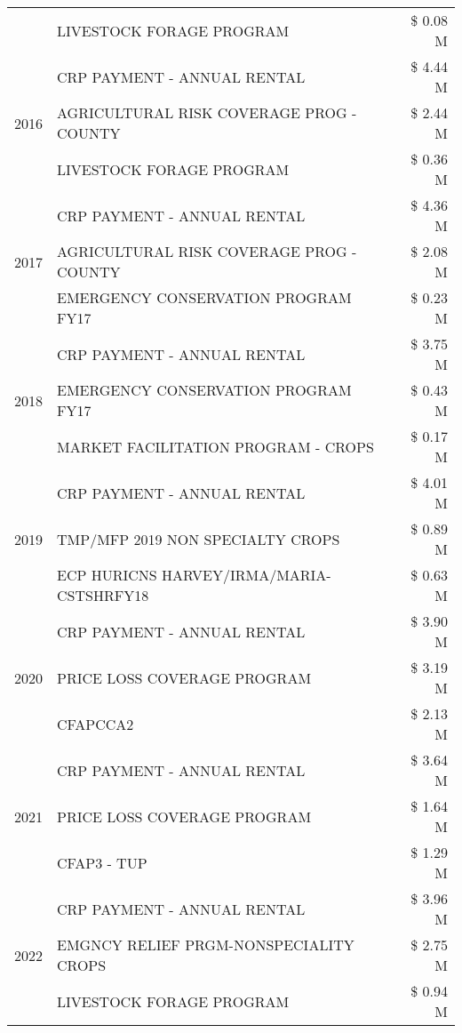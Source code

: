 \begin{tabular}{llr}
 & LIVESTOCK FORAGE PROGRAM & \$ 0.08 M \\
\cline{1-3}
\multirow[t]{3}{*}{2016} & CRP PAYMENT - ANNUAL RENTAL & \$ 4.44 M \\
 & AGRICULTURAL RISK COVERAGE PROG - COUNTY & \$ 2.44 M \\
 & LIVESTOCK FORAGE PROGRAM & \$ 0.36 M \\
\cline{1-3}
\multirow[t]{3}{*}{2017} & CRP PAYMENT - ANNUAL RENTAL & \$ 4.36 M \\
 & AGRICULTURAL RISK COVERAGE PROG - COUNTY & \$ 2.08 M \\
 & EMERGENCY CONSERVATION PROGRAM FY17 & \$ 0.23 M \\
\cline{1-3}
\multirow[t]{3}{*}{2018} & CRP PAYMENT - ANNUAL RENTAL & \$ 3.75 M \\
 & EMERGENCY CONSERVATION PROGRAM FY17 & \$ 0.43 M \\
 & MARKET FACILITATION PROGRAM - CROPS & \$ 0.17 M \\
\cline{1-3}
\multirow[t]{3}{*}{2019} & CRP PAYMENT - ANNUAL RENTAL & \$ 4.01 M \\
 & TMP/MFP 2019 NON SPECIALTY CROPS & \$ 0.89 M \\
 & ECP HURICNS HARVEY/IRMA/MARIA-CSTSHRFY18 & \$ 0.63 M \\
\cline{1-3}
\multirow[t]{3}{*}{2020} & CRP PAYMENT - ANNUAL RENTAL & \$ 3.90 M \\
 & PRICE LOSS COVERAGE PROGRAM & \$ 3.19 M \\
 & CFAPCCA2 & \$ 2.13 M \\
\cline{1-3}
\multirow[t]{3}{*}{2021} & CRP PAYMENT - ANNUAL RENTAL & \$ 3.64 M \\
 & PRICE LOSS COVERAGE PROGRAM & \$ 1.64 M \\
 & CFAP3 - TUP & \$ 1.29 M \\
\cline{1-3}
\multirow[t]{3}{*}{2022} & CRP PAYMENT - ANNUAL RENTAL & \$ 3.96 M \\
 & EMGNCY RELIEF PRGM-NONSPECIALITY CROPS & \$ 2.75 M \\
 & LIVESTOCK FORAGE PROGRAM & \$ 0.94 M \\
\cline{1-3}
\bottomrule
\end{tabular}
